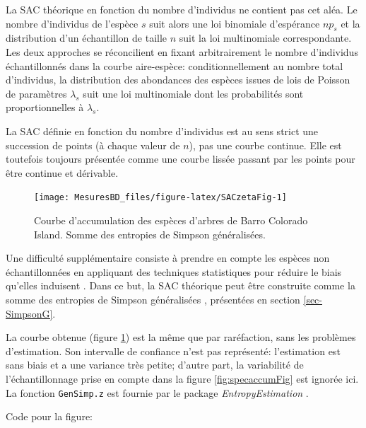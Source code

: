 \documentclass[
  11pt,
  french,
  a4paper,
  extrafontsizes,onecolumn,openright
  ]{memoir}
\begin{document}
La SAC théorique en fonction du nombre d'individus ne contient pas cet aléa.
Le nombre d'individus de l'espèce \(s\) suit alors une loi binomiale d'espérance \(np_s\) et la distribution d'un échantillon de taille \(n\) suit la loi multinomiale correspondante.
Les deux approches se réconcilient en fixant arbitrairement le nombre d'individus échantillonnés dans la courbe aire-espèce: conditionnellement au nombre total d'individus, la distribution des abondances des espèces issues de lois de Poisson de paramètres \(\lambda_s\) suit une loi multinomiale \autocite{Steel1953} dont les probabilités sont proportionnelles à \(\lambda_s\).

La SAC définie en fonction du nombre d'individus est au sens strict une succession de points (à chaque valeur de \(n\)), pas une courbe continue.
Elle est toutefois toujours présentée comme une courbe lissée passant par les points pour être continue et dérivable.



\scriptsize

\begin{figure}

{\centering \texttt{[image: MesuresBD\_files/figure-latex/SACzetaFig-1]} 

}

\caption{Courbe d'accumulation des espèces d'arbres de Barro Colorado Island. Somme des entropies de Simpson généralisées.}\label{fig:SACzetaFig}
\end{figure}

\normalsize

Une difficulté supplémentaire consiste à prendre en compte les espèces non échantillonnées en appliquant des techniques statistiques pour réduire le biais qu'elles induisent \autocite{Colwell2012}.
Dans ce but, la SAC théorique peut être construite \autocite{Chao2013} comme la somme des entropies de Simpson généralisées \autocite{Zhang2010}, présentées en section \ref{sec-SimpsonG}.

La courbe obtenue (figure \ref{fig:SACzetaFig}) est la même que par raréfaction, sans les problèmes d'estimation.
Son intervalle de confiance n'est pas représenté: l'estimation est sans biais et a une variance très petite; d'autre part, la variabilité de l'échantillonnage prise en compte dans la figure \ref{fig:specaccumFig} est ignorée ici. La fonction \texttt{GenSimp.z} est fournie par le package \emph{EntropyEstimation} \autocite{Cao2014}.

Code pour la figure:
\end{document}
